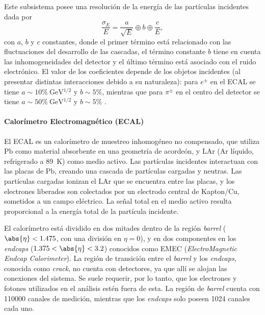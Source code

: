 Este subsistema posee una resolución de la energía de las partículas incidentes dada por
\[ \frac{\sigma_E}{E} = \frac{a}{\sqrt{E}} \oplus b \oplus \frac{c}{E}, \]
con $a$, $b$ y $c$ constantes, donde el primer término está relacionado con las fluctuaciones del desarrollo de las cascadas, el término constante $b$ tiene en cuenta las inhomogeneidades del detector y el último término está asociado con el ruido electrónico. El valor de los coeficientes depende de los objetos incidentes (al presentar distintas interacciones debido a su naturaleza): para $e^\pm$ en el ECAL se tiene $a \sim 10\% \ \si{\GeV^{1/2}}$ y $b \sim 5\%$, mientras que para $\pi^\pm$ en el centro del detector se tiene $a \sim 50\% \ \si{\GeV^{1/2}}$ y $b \sim 5\%$ \cites[-4.5em][]{Spettel2016}[-1.5em][]{Plucinski2014}.

\paragraph{Calorímetro Electromagnético (ECAL)}

El ECAL es un calorímetro de muestreo inhomogéneo no compensado, que utiliza $\textrm{Pb}$ como material absorbente en una geometría de acordeón, y $\textrm{LAr}$ ($\textrm{Ar}$ líquido, refrigerado a \SI{89}{\kelvin}) como medio activo. Las partículas incidentes interactuan con las placas de $\textrm{Pb}$, creando una cascada de partículas cargadas y neutras. Las partículas cargadas ionizan el $\textrm{LAr}$ que se encuentra entre las placas, y los electrones liberados son colectados por un electrodo central de Kapton/$\textrm{Cu}$, sometidos a un campo eléctrico. La señal total en el medio activo resulta proporcional a la energía total de la partícula incidente.

El calorímetro está dividido en dos mitades dentro de la región \textit{barrel} ($\abs{\eta} < 1.475$, con una división en $\eta = 0$), y en dos componentes en los \textit{endcaps} ($1.375 < \abs{\eta} < 3.2$) conocidos como EMEC (\textit{ElectroMagnetic Endcap Calorimeter}). La región de transición entre el \textit{barrel} y los \textit{endcaps}, conocida como \textit{crack}, no cuenta con detectores, ya que allí se alojan las conexiones del sistema. Se suele requerir, por lo tanto, que los electrones y fotones utilizados en el análisis estén fuera de esta. La región de \textit{barrel} cuenta con 110000 canales de medición, mientras que los \textit{endcaps} solo poseen 1024 canales cada uno.

